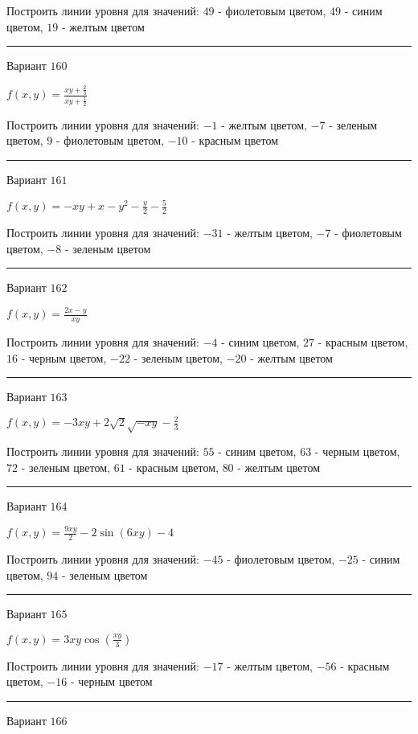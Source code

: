 \documentclass[11pt]{report}
\begin{document}
Построить линии уровня для значений: $49$ - фиолетовым цветом, $49$ - синим цветом, $19$ - желтым цветом
\begin{center}
\noindent\rule{8cm}{0.4pt}
\end{center}
Вариант $160$


$f(x, y) = \frac{x y + \frac{2}{3}}{x y + \frac{1}{2}}$

Построить линии уровня для значений: $-1$ - желтым цветом, $-7$ - зеленым цветом, $9$ - фиолетовым цветом, $-10$ - красным цветом
\begin{center}
\noindent\rule{8cm}{0.4pt}
\end{center}
Вариант $161$


$f(x, y) = - x y + x - y^{2} - \frac{y}{2} - \frac{5}{2}$

Построить линии уровня для значений: $-31$ - желтым цветом, $-7$ - фиолетовым цветом, $-8$ - зеленым цветом
\begin{center}
\noindent\rule{8cm}{0.4pt}
\end{center}
Вариант $162$


$f(x, y) = \frac{2 x - y}{x y}$

Построить линии уровня для значений: $-4$ - синим цветом, $27$ - красным цветом, $16$ - черным цветом, $-22$ - зеленым цветом, $-20$ - желтым цветом
\begin{center}
\noindent\rule{8cm}{0.4pt}
\end{center}
Вариант $163$


$f(x, y) = - 3 x y + 2 \sqrt{2} \sqrt{- x y} - \frac{2}{3}$

Построить линии уровня для значений: $55$ - синим цветом, $63$ - черным цветом, $72$ - зеленым цветом, $61$ - красным цветом, $80$ - желтым цветом
\begin{center}
\noindent\rule{8cm}{0.4pt}
\end{center}
Вариант $164$


$f(x, y) = \frac{9 x y}{2} - 2 \sin{\left(6 x y \right)} - 4$

Построить линии уровня для значений: $-45$ - фиолетовым цветом, $-25$ - синим цветом, $94$ - зеленым цветом
\begin{center}
\noindent\rule{8cm}{0.4pt}
\end{center}
Вариант $165$


$f(x, y) = 3 x y \cos{\left(\frac{x y}{3} \right)}$

Построить линии уровня для значений: $-17$ - желтым цветом, $-56$ - красным цветом, $-16$ - черным цветом
\begin{center}
\noindent\rule{8cm}{0.4pt}
\end{center}
Вариант $166$
\end{document}
